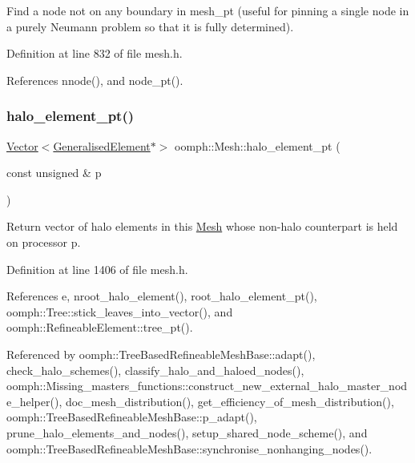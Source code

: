 Find a node not on any boundary in mesh\+\_\+pt (useful for pinning a single node in a purely Neumann problem so that it is fully determined). 



Definition at line 832 of file mesh.\+h.



References nnode(), and node\+\_\+pt().

\mbox{\label{classoomph_1_1Mesh_afe6eb606740b41ab503a7199a23ebc97}} 
\subsubsection{\texorpdfstring{halo\+\_\+element\+\_\+pt()}{halo\_element\_pt()}}
{\footnotesize\ttfamily \hyperlink{classoomph_1_1Vector}{Vector}$<$\hyperlink{classoomph_1_1GeneralisedElement}{Generalised\+Element}$\ast$$>$ oomph\+::\+Mesh\+::halo\+\_\+element\+\_\+pt (\begin{DoxyParamCaption}\item[{const unsigned \&}]{p }\end{DoxyParamCaption})\hspace{0.3cm}{\ttfamily [inline]}}



Return vector of halo elements in this \hyperlink{classoomph_1_1Mesh}{Mesh} whose non-\/halo counterpart is held on processor p. 



Definition at line 1406 of file mesh.\+h.



References e, nroot\+\_\+halo\+\_\+element(), root\+\_\+halo\+\_\+element\+\_\+pt(), oomph\+::\+Tree\+::stick\+\_\+leaves\+\_\+into\+\_\+vector(), and oomph\+::\+Refineable\+Element\+::tree\+\_\+pt().



Referenced by oomph\+::\+Tree\+Based\+Refineable\+Mesh\+Base\+::adapt(), check\+\_\+halo\+\_\+schemes(), classify\+\_\+halo\+\_\+and\+\_\+haloed\+\_\+nodes(), oomph\+::\+Missing\+\_\+masters\+\_\+functions\+::construct\+\_\+new\+\_\+external\+\_\+halo\+\_\+master\+\_\+node\+\_\+helper(), doc\+\_\+mesh\+\_\+distribution(), get\+\_\+efficiency\+\_\+of\+\_\+mesh\+\_\+distribution(), oomph\+::\+Tree\+Based\+Refineable\+Mesh\+Base\+::p\+\_\+adapt(), prune\+\_\+halo\+\_\+elements\+\_\+and\+\_\+nodes(), setup\+\_\+shared\+\_\+node\+\_\+scheme(), and oomph\+::\+Tree\+Based\+Refineable\+Mesh\+Base\+::synchronise\+\_\+nonhanging\+\_\+nodes().

